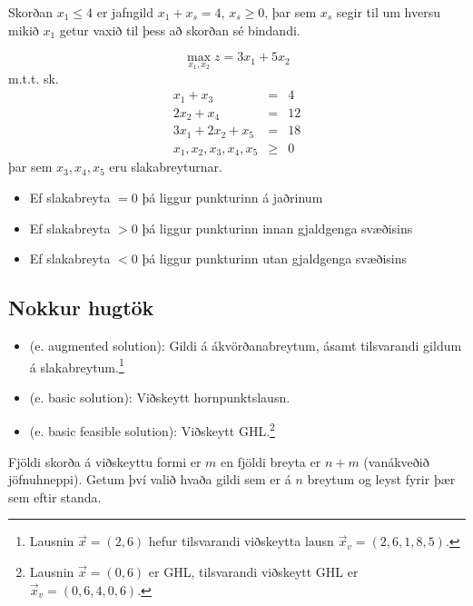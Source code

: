 \begin{daemi}
 Skorðan $x_1\leq4$ er jafngild $x_1+x_s=4$, $x_s\geq0$, þar sem $x_s$ segir til um hversu mikið $x_1$ getur vaxið til þess að skorðan sé bindandi.
\end{daemi}
\begin{daemi}
$$ \max_{x_1,x_2}  z = 3x_1 + 5 x_2 $$
m.t.t. sk. 
\begin{eqnarray*}
 x_1+x_3 & =& 4 \\
 2 x_2 +x_4& =& 12 \\
 3x_1 + 2 x_2 +x_5& =& 18 \\
 x_1 , x_2, x_3,x_4,x_5 &\ge& 0
\end{eqnarray*}
þar sem $x_3,x_4,x_5$ eru slakabreyturnar.
\end{daemi}
\begin{aths}\hspace{.1cm}
 \begin{itemize}
  \item Ef slakabreyta $=0$ þá liggur punkturinn á jaðrinum
  \item Ef slakabreyta $>0$ þá liggur punkturinn innan gjaldgenga svæðisins
  \item Ef slakabreyta $<0$ þá liggur punkturinn utan gjaldgenga svæðisins
 \end{itemize}
\end{aths}


\subsection{Nokkur hugtök}

\begin{itemize}
 \item {} (e. augmented solution): Gildi á ákvörðana\-breytum, ásamt tilsvarandi gildum á slakabreytum.\footnote{
 Lausnin $\vec{x}=(2,6)$ hefur tilsvarandi viðskeytta lausn \mbox{$\vec{x}_v=(2,6,1,8,5)$}.}
 \item {} (e. basic solution): Viðskeytt hornpunktslausn.
 \item {} (e. basic feasible solution): Viðskeytt GHL.\footnote{
 Lausnin $\vec{x}=(0,6)$ er GHL, tilsvarandi viðskeytt GHL er \mbox{$\vec{x}_v=(0,6,4,0,6)$}.}
\end{itemize}
Fjöldi skorða á viðskeyttu formi er $m$ en fjöldi breyta er $n+m$ (vanákveðið jöfnuhneppi). Getum því valið hvaða gildi sem er á $n$ breytum og leyst fyrir þær sem eftir standa.

